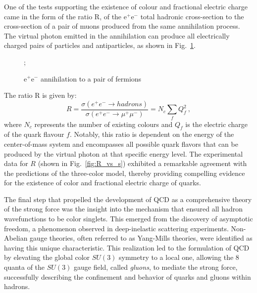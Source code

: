 One of the tests supporting the existence of colour and fractional electric charge came in the form of the ratio R, of the $\mathrm{e}^+ \mathrm{e}^-$ total hadronic cross-section to the cross-section of a pair of muons produced from the same annihilation process. The virtual photon emitted in the annihilation can produce all electrically charged pairs of particles and antiparticles, as shown in Fig.~\ref{fig:ee_to_ff_diagram}.

\begin{figure}[h]
    \centering
        ;
\caption{$\mathrm{e}^+ \mathrm{e}^-$ annihilation to a pair of fermions}
    \label{fig:ee_to_ff_diagram}
\end{figure}


The ratio R is given by:
\begin{equation*}
    R = \frac{\sigma(e^+e^- \rightarrow hadrons)}{\sigma(e^+e^- \rightarrow \mu^+\mu^-)} = N_c \sum_f Q_f^2\ ,
\end{equation*}
where $N_c$ represents the number of existing colours and $Q_f$ is the electric charge of the quark flavour $f$. Notably, this ratio is dependent on the energy of the center-of-mass system and encompasses all possible quark flavors that can be produced by the virtual photon at that specific energy level. The experimental data for $R$ (shown in Fig.~\ref{fig:R_vs_s}) exhibited a remarkable agreement with the predictions of the three-color model, thereby providing compelling evidence for the existence of color and fractional electric charge of quarks.

The final step that propelled the development of QCD as a comprehensive theory of the strong force was the insight into the mechanism that ensured all hadron wavefunctions to be color singlets. This emerged from the discovery of asymptotic freedom, a phenomenon observed in deep-inelastic scattering experiments. Non-Abelian gauge theories, often referred to as Yang-Mills theories, were identified as having this unique characteristic. This realization led to the formulation of QCD by elevating the global color $SU(3)$ symmetry to a local one, allowing the 8 quanta of the $SU(3)$ gauge field, called \emph{gluons}, to mediate the strong force, successfully describing the confinement and behavior of quarks and gluons within hadrons.

